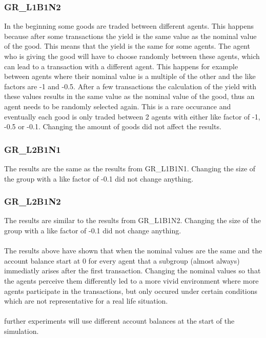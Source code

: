 \documentclass[twoside,openright]{uva-bachelor-thesis}
\begin{document}
\subsubsection{GR\_L1B1N2}
In the beginning some goods are traded between different agents. This happens because after some transactions the yield is the same value as the nominal value of the good. This means that the yield is the same for some agents. The agent who is giving the good will have to choose randomly between these agents, which can lead to a transaction with a different agent. This happens for example between agents where their nominal value is a multiple of the other and the like factors are -1 and -0.5. After a few transactions the calculation of the yield with these values results in the same value as the nominal value of the good, thus an agent needs to be randomly selected again. This is a rare occurance and eventually each good is only traded between 2 agents with either like factor of -1, -0.5 or -0.1. Changing the amount of goods did not affect the results.
\subsubsection{GR\_L2B1N1}
The results are the same as the results from GR\_L1B1N1. Changing the size of the group with a like factor of -0.1 did not change anything. 
\subsubsection{GR\_L2B1N2}
The results are similar to the results from GR\_L1B1N2.  Changing the size of the group with a like factor of -0.1 did not change anything. 
\\
\\
The results above have shown that when the nominal values are the same and the account balance start at 0 for every agent that a subgroup (almost always) immediatly arises after the first transaction. Changing the nominal values so that the agents perceive them differently led to a more vivid environment where more agents participate in the transactions, but only occured under certain conditions which are not representative for a real life situation. 
\\
\\
further experiments will use different account balances at the start of the simulation.
\end{document}
